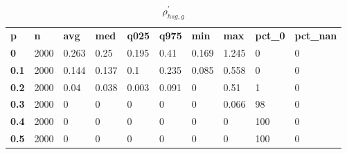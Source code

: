 \begin{table}[h]
 \centering 
\footnotesize
\caption{$\rho_{hsg,g}^\prime $}
\label{tab:alphahsgg}
\begin{tabular}[h]{| l l l l l l l l l l|
    } \hline
\textbf{ p} & \textbf{ n} & \textbf{ avg} & \textbf{ med} & \textbf{ q025} & \textbf{ q975} & \textbf{ min} & \textbf{ max} & \textbf{ pct\_0} & \textbf{ pct\_nan}
           \\
  \textbf{  0} & 2000 & 0.263 &  0.25 & 0.195 &  0.41 & 0.169 & 1.245 &   0 & 0
           \\
  \textbf{0.1} & 2000 & 0.144 & 0.137 &   0.1 & 0.235 & 0.085 & 0.558 &   0 & 0
           \\
  \textbf{0.2} & 2000 &  0.04 & 0.038 & 0.003 & 0.091 &     0 &  0.51 &   1 & 0
           \\
  \textbf{0.3} & 2000 &     0 &     0 &     0 &     0 &     0 & 0.066 &  98 & 0
           \\
  \textbf{0.4} & 2000 &     0 &     0 &     0 &     0 &     0 &     0 & 100 & 0
           \\
  \textbf{0.5} & 2000 &     0 &     0 &     0 &     0 &     0 &     0 & 100 & 0
           \\
 \hline \end{tabular}
 \end{table}
